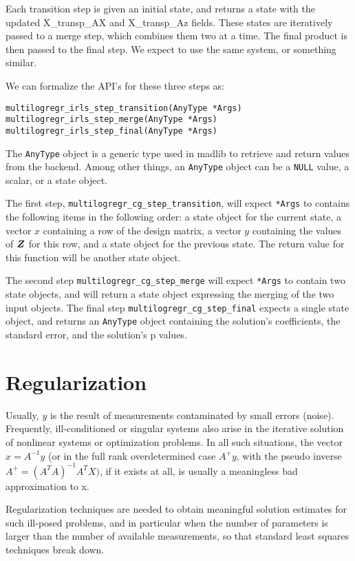 Each transition step is given an initial state, and returns a state with the updated X\_transp\_AX and X\_transp\_Az fields.  These states are iteratively passed to a merge step, which combines them two at a time.  The final product is then passed to the final step.  We expect to use the same system, or something similar.

We can formalize the API's for these three steps as:
\begin{verbatim}
multilogregr_irls_step_transition(AnyType *Args)
multilogregr_irls_step_merge(AnyType *Args)
multilogregr_irls_step_final(AnyType *Args)
\end{verbatim}
The \texttt{AnyType} object is a generic type used in  madlib to retrieve and return values from the backend.  Among other things, an  \texttt{AnyType} object can be a \texttt{NULL} value, a scalar, or a state object.

The first step, \texttt{multilogregr\_cg\_step\_transition}, will expect \texttt{*Args} to contains the following items in the following order: a state object for the current state, a vector $x$ containing a row of the design matrix, a vector $y$ containing the values of $\boldsymbol{Z}$ for this row, and a state object for the previous state.  The return value for this function will be another state object.

The second step \texttt{multilogregr\_cg\_step\_merge} will expect \texttt{*Args} to contain two state objects, and will return a state object expressing the merging of the two input objects.  The final step \texttt{multilogregr\_cg\_step\_final} expects a single state object, and returns an \texttt{AnyType} object containing the solution's coefficients, the standard error, and the solution's p values.


\section{Regularization} %
\label{sub:regularization}

Usually, $y$ is the result of measurements contaminated by small errors (noise).
Frequently, ill-conditioned or singular systems also arise in the iterative
solution of nonlinear systems or optimization problems. In all such situations,
the vector $x = {A}^{-1}y$ (or in the full rank overdetermined case $A^+ y$,
with the pseudo inverse $A^+ = (A^T A)^{-1}A^T X)$, if it exists at all, is
usually a meaningless bad approximation to x.

Regularization techniques are needed to obtain meaningful solution estimates
for such ill-posed problems, and in particular when the number of parameters
is larger than the number of available measurements, so that standard least
squares techniques break down.

